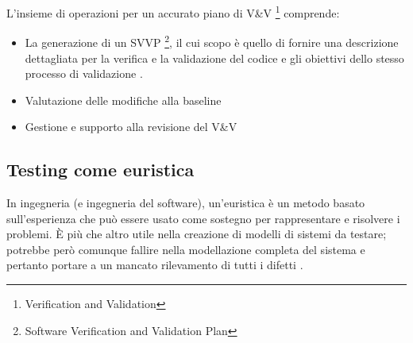 \documentclass[../main.tex]{subfiles}
\begin{document}
L'insieme di operazioni per un accurato piano di V\&V \footnote{Verification and Validation} comprende:
\begin{itemize}
\item La generazione di un SVVP \footnote{Software Verification and Validation Plan}, il cui scopo è quello di fornire una descrizione dettagliata per la verifica e la validazione del codice e gli obiettivi dello stesso processo di validazione \cite{ieee1012}.
\item Valutazione delle modifiche alla baseline
\item Gestione e supporto alla revisione del V\&V
\end{itemize}

\subsection{Testing come euristica}
In ingegneria (e ingegneria del software), un'euristica è un metodo basato sull'esperienza che può essere usato come sostegno per rappresentare e risolvere i problemi. È più che altro utile nella creazione di modelli di sistemi da testare; potrebbe però comunque fallire nella modellazione completa del sistema e pertanto portare a un mancato rilevamento di tutti i difetti \cite{iso29119}.
\end{document}
